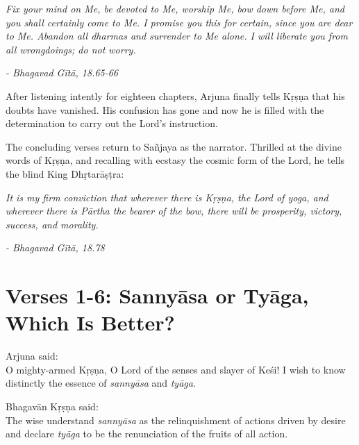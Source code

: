 \begin{customquote}\fontsize{10}{11}\selectfont
\textit{Fix your mind on Me, be devoted to Me, worship Me, bow down before Me, and you shall certainly come to Me. I promise you this for certain, since you are dear to Me. Abandon all \textit{dharmas} and surrender to Me alone. I will liberate you from all wrongdoings; do not worry.}

\textit{- Bhagavad Gītā, 18.65-66}
\end{customquote}

After listening intently for eighteen chapters, Arjuna finally tells Kṛṣṇa that his doubts have vanished. His confusion has gone and now he is filled with the determination to carry out the Lord’s instruction.

The concluding verses return to Sañjaya as the narrator. Thrilled at the divine words of Kṛṣṇa, and recalling with ecstasy the cosmic form of the Lord, he tells the blind King Dhṛtarāṣṭra:

\begin{customquote}\fontsize{10}{11}\selectfont
\textit{It is my firm conviction that wherever there is Kṛṣṇa, the Lord of \textit{yoga}, and wherever there is Pārtha the bearer of the bow, there will be prosperity, victory, success, and morality.}

\textit{- Bhagavad Gītā, 18.78}
\end{customquote}



\section{Verses 1-6: Sannyāsa or Tyāga, Which Is Better?}\label{sec-verses-1-6-sannyasa-or-tyaga-which-is-better}

{\hspace*{1em}Arjuna said: \\
O mighty-armed Kṛṣṇa, O Lord of the senses and slayer of Keśi! I wish to know distinctly the essence of \textit{sannyāsa} and \textit{tyāga}.}

{\hspace*{1em}Bhagavān Kṛṣṇa said: \\
The wise understand \textit{sannyāsa} as the relinquishment of actions driven by desire and declare \textit{tyāga} to be the renunciation of the fruits of all action.}

